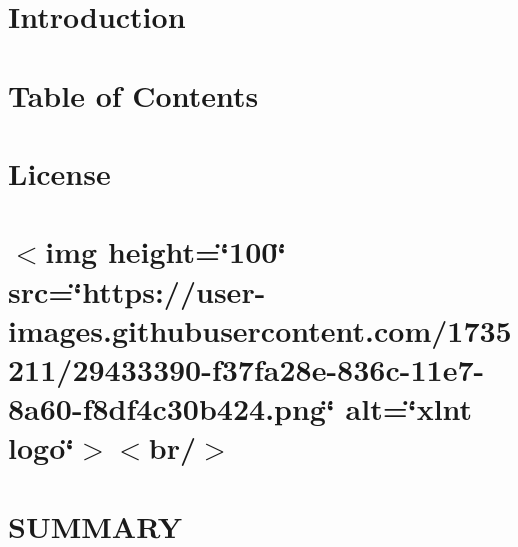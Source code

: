 \let\mypdfximage\pdfximage\def\pdfximage{\immediate\mypdfximage}\documentclass[twoside]{book}
\newcommand{\+}{\discretionary{\mbox{\scriptsize$\hookleftarrow$}}{}{}}
\begin{document}
\chapter{Introduction}
\label{md__c___users_nouet__documents__cours_5_a__dev__p_r_d__prd_coprod__prd_coprod_libs_xlnt_1_5_0_docs_introduction__r_e_a_d_m_e}

\chapter{Table of Contents}
\label{md__c___users_nouet__documents__cours_5_a__dev__p_r_d__prd_coprod__prd_coprod_libs_xlnt_1_5_0_docs__r_e_a_d_m_e}

\chapter{License}
\label{md__c___users_nouet__documents__cours_5_a__dev__p_r_d__prd_coprod__prd_coprod_libs_xlnt_1_5_0__l_i_c_e_n_s_e}

\chapter{$<$img height=\char`\"{}100\char`\"{} src=\char`\"{}https\+://user-\/images.\+githubusercontent.\+com/1735211/29433390-\/f37fa28e-\/836c-\/11e7-\/8a60-\/f8df4c30b424.\+png\char`\"{} alt=\char`\"{}xlnt logo\char`\"{}$>$$<$br/$>$}
\label{md__c___users_nouet__documents__cours_5_a__dev__p_r_d__prd_coprod__prd_coprod_libs_xlnt_1_5_0__r_e_a_d_m_e}

\chapter{SUMMARY}
\label{md__c___users_nouet__documents__cours_5_a__dev__p_r_d__prd_coprod__prd_coprod_libs_xlnt_1_5_0__s_u_m_m_a_r_y}

\end{document}
